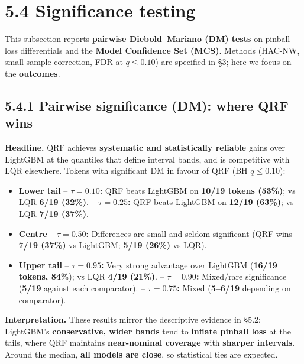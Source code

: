 \documentclass[
  a4paper,
  DIV=11,
  numbers=noendperiod]{scrreprt}
\begin{document}
\section{5.4 Significance testing}\label{significance-testing}

This subsection reports \textbf{pairwise Diebold--Mariano (DM) tests} on
pinball-loss differentials and the \textbf{Model Confidence Set (MCS)}.
Methods (HAC-NW, small-sample correction, FDR at \(q\le 0.10\)) are
specified in §3; here we focus on the \textbf{outcomes}.

\subsection{5.4.1 Pairwise significance (DM): where QRF
wins}\label{pairwise-significance-dm-where-qrf-wins}

\textbf{Headline.} QRF achieves \textbf{systematic and statistically
reliable} gains over LightGBM at the quantiles that define interval
bands, and is competitive with LQR elsewhere. Tokens with significant DM
in favour of QRF (BH \(q\le 0.10\)):

\begin{itemize}
\item
  \textbf{Lower tail} -- \textbf{\(\tau=0.10\):} QRF beats LightGBM on
  \textbf{10/19 tokens (53\%)}; vs LQR \textbf{6/19 (32\%)}. --
  \textbf{\(\tau=0.25\):} QRF beats LightGBM on \textbf{12/19 (63\%)};
  vs LQR \textbf{7/19 (37\%)}.
\item
  \textbf{Centre} -- \textbf{\(\tau=0.50\):} Differences are small and
  seldom significant (QRF wins \textbf{7/19 (37\%)} vs LightGBM;
  \textbf{5/19 (26\%)} vs LQR).
\item
  \textbf{Upper tail} -- \textbf{\(\tau=0.95\):} Very strong advantage
  over LightGBM (\textbf{16/19 tokens, 84\%}); vs LQR \textbf{4/19
  (21\%)}. -- \textbf{\(\tau=0.90\):} Mixed/rare significance
  (\textbf{5/19} against each comparator). -- \textbf{\(\tau=0.75\):}
  Mixed (\textbf{5--6/19} depending on comparator).
\end{itemize}

\textbf{Interpretation.} These results mirror the descriptive evidence
in §5.2: LightGBM's \textbf{conservative, wider bands} tend to
\textbf{inflate pinball loss} at the tails, where QRF maintains
\textbf{near-nominal coverage} with \textbf{sharper intervals}. Around
the median, \textbf{all models are close}, so statistical ties are
expected.
\end{document}
